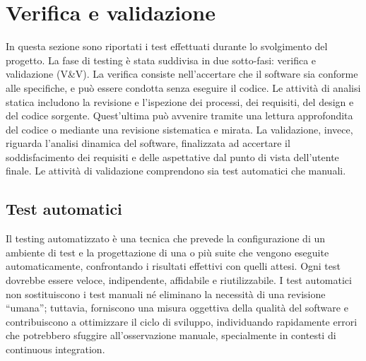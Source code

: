 \chapter{Verifica e validazione}
\label{cap:verifica-validazione}

\par In questa sezione sono riportati i test effettuati durante lo svolgimento del progetto. La fase di testing è stata suddivisa in due sotto-fasi: verifica e validazione (V\&V). La verifica consiste nell’accertare che il software sia conforme alle specifiche, e può essere condotta senza eseguire il codice. Le attività di analisi statica includono la revisione e l’ispezione dei processi, dei \gls{requisiti}, del design e del codice sorgente. Quest’ultima può avvenire tramite una lettura approfondita del codice o mediante una revisione sistematica e mirata. La validazione, invece, riguarda l’analisi dinamica del software, finalizzata ad accertare il soddisfacimento dei \gls{requisiti} e delle aspettative dal punto di vista dell’utente finale. Le attività di validazione comprendono sia test automatici che manuali.


\section{Test automatici}

\par Il testing automatizzato è una tecnica che prevede la configurazione di un ambiente di test e la progettazione di una o più suite che vengono eseguite automaticamente, confrontando i risultati effettivi con quelli attesi. Ogni test dovrebbe essere veloce, indipendente, affidabile e riutilizzabile. I test automatici non sostituiscono i test manuali né eliminano la necessità di una revisione “umana”; tuttavia, forniscono una misura oggettiva della qualità del software e contribuiscono a ottimizzare il ciclo di sviluppo, individuando rapidamente errori che potrebbero sfuggire all’osservazione manuale, specialmente in contesti di \gls{continuous integration}.

